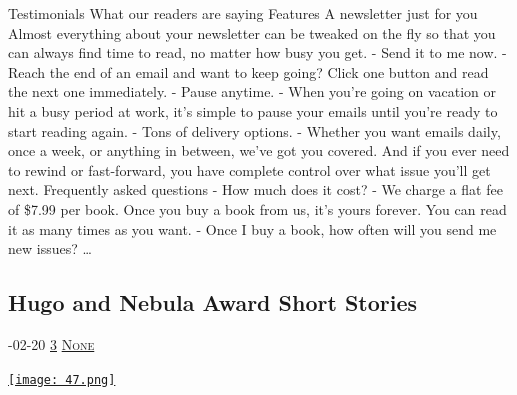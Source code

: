 \documentclass[10pt,a4paper]{article}
\begin{document}
\begin{multicols}{2}
Testimonials
What our readers are saying
Features
A newsletter just for you
Almost everything about your newsletter can be tweaked on the fly so that you can always find time to read, no matter how busy you get.
- Send it to me now.
- Reach the end of an email and want to keep going? Click one button and read the next one immediately.
- Pause anytime.
- When you're going on vacation or hit a busy period at work, it's simple to pause your emails until you're ready to start reading again.
- Tons of delivery options.
- Whether you want emails daily, once a week, or anything in between, we've got you covered. And if you ever need to rewind or fast-forward, you have complete control over what issue you'll get next.
Frequently asked questions
- How much does it cost?
-
We charge a flat fee of \$7.99 per book. Once you buy a book from us, it's yours forever. You can read it as many times as you want.
- Once I buy a book, how often will you send me new issues?
\dots\par
\noindent\begin{minipage}{\linewidth}
\medskip
\subsection{Hugo and Nebula Award Short Stories}
\textsc{\footnotesize
{\scriptsize\faCalendar}-02-20 
{\scriptsize\faThumbsOUp}\space 
\href{http://news.ycombinator.com/item?id=37314493\&utm\_term=comment}{3} 
{\scriptsize\faComments}\space 
\href{http://news.ycombinator.com/item?id=37314493\&utm\_term=comment}{None} 
}
\par\medskip\noindent
\href{https://litsifi.com/short\_stories/hugo?utm\_source=hackernewsletter\&utm\_medium=email\&utm\_term=books}{
    \texttt{[image: 47.png]}
}
\end{minipage}

\end{multicols}
\end{document}
